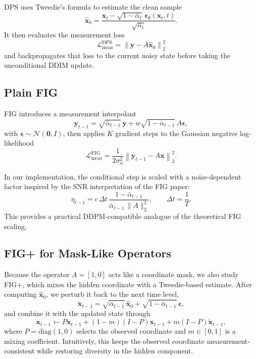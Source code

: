 \documentclass[10pt,twocolumn]{article}
\begin{document}
DPS uses Tweedie's formula to estimate the clean sample
\begin{equation}
\hat{\mathbf{x}}_0
=
\frac{
\mathbf{x}_t - \sqrt{1-\bar{\alpha}_t}\,\boldsymbol{\epsilon}_\theta(\mathbf{x}_t,t)
}{
\sqrt{\bar{\alpha}_t}
}.
\end{equation}
It then evaluates the measurement loss
\begin{equation}
\mathcal{L}_{\mathrm{meas}}^{\mathrm{DPS}}
=
\left\|
\mathbf{y} - A\hat{\mathbf{x}}_0
\right\|_2^2
\end{equation}
and backpropagates that loss to the current noisy state before taking the unconditional DDIM update.

\subsection{Plain FIG}

FIG introduces a measurement interpolant
\begin{equation}
\mathbf{y}_{t-1}
=
\sqrt{\bar{\alpha}_{t-1}}\,\mathbf{y}
+
w\sqrt{1-\bar{\alpha}_{t-1}}\,A\boldsymbol{\epsilon},
\end{equation}
with \(\boldsymbol{\epsilon}\sim\mathcal{N}(\mathbf{0}, I)\), then applies \(K\) gradient steps to the Gaussian negative log-likelihood
\begin{equation}
\mathcal{L}_{\mathrm{meas}}^{\mathrm{FIG}}
=
\frac{1}{2\sigma_n^2}
\left\|
\mathbf{y}_{t-1} - A\mathbf{x}
\right\|_2^2.
\end{equation}

In our implementation, the conditional step is scaled with a noise-dependent factor inspired by the SNR interpretation of the FIG paper:
\begin{equation}
\eta_{t-1}
=
c\,\Delta t\,
\frac{1-\bar{\alpha}_{t-1}}{\bar{\alpha}_{t-1}\,\|A\|_2^2},
\qquad
\Delta t = \frac{1}{T}.
\end{equation}
This provides a practical DDPM-compatible analogue of the theoretical FIG scaling.

\subsection{FIG+ for Mask-Like Operators}

Because the operator \(A=[1,0]\) acts like a coordinate mask, we also study FIG+, which mixes the hidden coordinate with a Tweedie-based estimate. After computing \(\hat{\mathbf{x}}_0\), we perturb it back to the next time level,
\begin{equation}
\tilde{\mathbf{x}}_{t-1}
=
\sqrt{\bar{\alpha}_{t-1}}\,\hat{\mathbf{x}}_0
+
\sqrt{1-\bar{\alpha}_{t-1}}\,\boldsymbol{\epsilon},
\end{equation}
and combine it with the updated state through
\begin{equation}
\mathbf{x}_{t-1}
\leftarrow
P\mathbf{x}_{t-1}
+
(1-m)(I-P)\mathbf{x}_{t-1}
+
m(I-P)\tilde{\mathbf{x}}_{t-1},
\end{equation}
where \(P=\mathrm{diag}(1,0)\) selects the observed coordinate and \(m\in[0,1]\) is a mixing coefficient. Intuitively, this keeps the observed coordinate measurement-consistent while restoring diversity in the hidden component.
\end{document}
